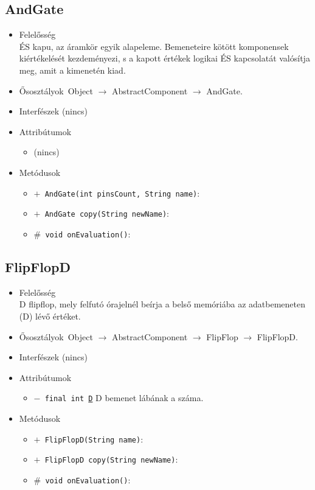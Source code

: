 \subsection{AndGate}
\begin{itemize}
\item Felelősség\\
ÉS kapu, az áramkör egyik alapeleme. Bemeneteire kötött komponensek  kiértékelését kezdeményezi, s a kapott értékek logikai ÉS kapcsolatát  valósítja meg, amit a kimenetén kiad.
\item Ősosztályok\ Object $\rightarrow{}$ AbstractComponent $\rightarrow{}$ AndGate.
\item Interfészek (nincs)
\item Attribútumok $\ $
\begin{itemize}
\item (nincs)
\end{itemize}
\item Metódusok$\ $
\begin{itemize}
	\item[] \texttt{$+$ AndGate(int pinsCount, String name)}: 
	\item[] \texttt{$+$ AndGate copy(String newName)}: 
	\item[] \texttt{$\#$ void onEvaluation()}: 
\end{itemize}
\end{itemize}

\subsection{FlipFlopD}
\begin{itemize}
\item Felelősség\\
D flipflop, mely felfutó órajelnél beírja a belső memóriába az adatbemeneten (D)  lévő értéket.
\item Ősosztályok\ Object $\rightarrow{}$ AbstractComponent $\rightarrow{}$ FlipFlop $\rightarrow{}$ FlipFlopD.
\item Interfészek (nincs)
\item Attribútumok $\ $
\begin{itemize}
	\item[] \texttt{$-$ final int \underline{D}} D bemenet lábának a száma.
\end{itemize}
\item Metódusok$\ $
\begin{itemize}
	\item[] \texttt{$+$ FlipFlopD(String name)}: 
	\item[] \texttt{$+$ FlipFlopD copy(String newName)}: 
	\item[] \texttt{$\#$ void onEvaluation()}: 
\end{itemize}
\end{itemize}

